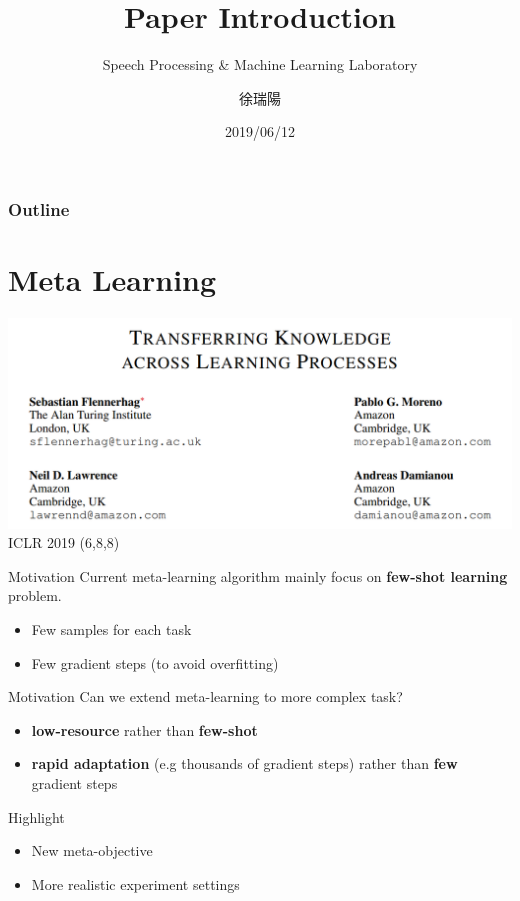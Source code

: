 \documentclass{beamer}
\title{Paper Introduction}
\subtitle{\textcolor[rgb]{0.00,0.50,1.00}{{Speech Processing \& Machine Learning Laboratory}}}
\author{徐瑞陽}
\date{2019/06/12}
\begin{document}
\begin{frame}
\maketitle
\end{frame}

\begin{frame}
\frametitle{Outline}
\tableofcontents
\end{frame}


\section{Meta Learning}
\begin{frame}
  \includegraphics[width=\textwidth]{fig/p1-title.png}
  \center ICLR 2019
  \center (6,8,8)
\end{frame}

\begin{frame}{Motivation}
  Current meta-learning algorithm mainly focus on \textbf{few-shot learning} problem. 
  \begin{itemize}
    \item Few samples for each task
    \item Few gradient steps (to avoid overfitting)
  \end{itemize}
\end{frame}

\begin{frame}{Motivation}
  Can we extend meta-learning to more complex task?
  \begin{itemize}
    \item \textbf{low-resource} rather than \textbf{few-shot}
    \item \textbf{rapid adaptation} (e.g thousands of gradient steps) rather than \textbf{few} gradient steps
  \end{itemize}
\end{frame}

\begin{frame}{Highlight}
  \begin{itemize}
    \item New meta-objective
    \item More realistic experiment settings
  \end{itemize}
\end{frame}
\end{document}
